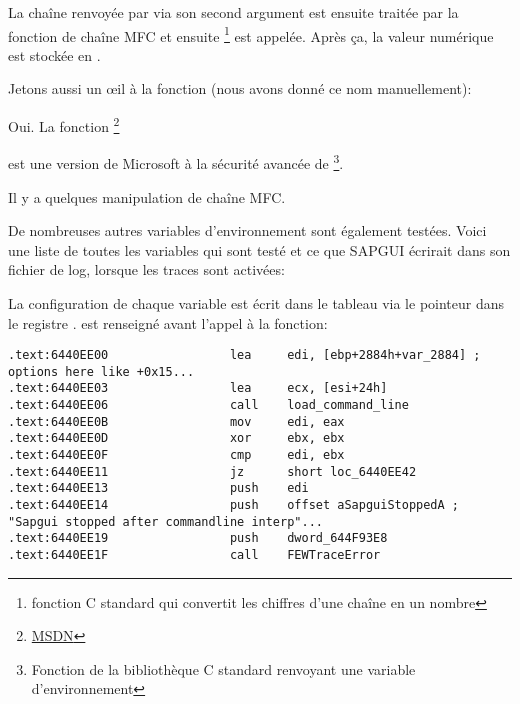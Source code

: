 


La chaîne renvoyée par  via son second argument est ensuite traitée
par la fonction de chaîne MFC et ensuite \footnote{fonction C standard
qui convertit les chiffres d'une chaîne en un nombre} est appelée.
Après ça, la valeur numérique est stockée en .

Jetons aussi un \oe{}il à la fonction  (nous avons donné ce nom manuellement):



Oui. La fonction \footnote{\href{http://msdn.microsoft.com/en-us/library/tb2sfw2z(VS.80).aspx}{MSDN}}

est une version de Microsoft à la sécurité avancée de \footnote{Fonction
de la bibliothèque C standard renvoyant une variable d'environnement}.


Il y a quelques manipulation de chaîne MFC.

De nombreuses autres variables d'environnement sont également testées.
Voici une liste de toutes les variables qui sont testé et ce que SAPGUI écrirait
dans son fichier de log, lorsque les traces sont activées:



La configuration de chaque variable est écrit dans le tableau via le pointeur dans
le registre \EDI. \EDI est renseigné avant l'appel à la fonction:

\begin{lstlisting}[style=customasmx86]
.text:6440EE00                 lea     edi, [ebp+2884h+var_2884] ; options here like +0x15...
.text:6440EE03                 lea     ecx, [esi+24h]
.text:6440EE06                 call    load_command_line
.text:6440EE0B                 mov     edi, eax
.text:6440EE0D                 xor     ebx, ebx
.text:6440EE0F                 cmp     edi, ebx
.text:6440EE11                 jz      short loc_6440EE42
.text:6440EE13                 push    edi
.text:6440EE14                 push    offset aSapguiStoppedA ; "Sapgui stopped after commandline interp"...
.text:6440EE19                 push    dword_644F93E8
.text:6440EE1F                 call    FEWTraceError
\end{lstlisting}

